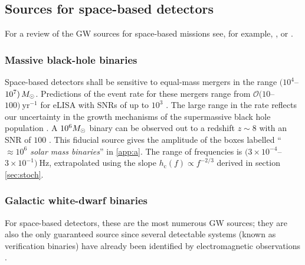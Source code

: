\subsection{Sources for space-based detectors}

For a review of the GW sources for space-based missions see, for example, \citet{Amaro-Seoane-et-al}, \citet{Gairetal} or \citet{eLISAyellowbook}.

\subsubsection{Massive black-hole binaries}

Space-based detectors shall be sensitive to equal-mass mergers in the range $(10^{4}$--$10^{7})\,M_{ \odot }$. Predictions of the event rate for these mergers range from ${\mathcal{O}}(10$--$100)~\mathrm{yr}^{-1}$ for eLISA with SNRs of up to $10^3$ \citep{TheGravitationalUniverse}. The large range in the rate reflects our uncertainty in the growth mechanisms of the supermassive black hole population \citep{Volonteri2010}. A $10^6 M_{ \odot }$ binary can be observed out to a redshift $z \sim 8$ with an SNR of $100$ \citep{TheGravitationalUniverse}. This fiducial source gives the amplitude of the boxes labelled ``\emph{$\mathit{\approx 10^{6}}$ solar mass binaries}'' in \ref{app:a}. The range of frequencies is $(3\times 10^{-4}$--$3\times 10^{-1})~\mathrm{Hz}$, extrapolated using the slope $h_\mathrm{c}(f) \propto f^{-2/3}$ derived in section \ref{sec:stoch}.


\subsubsection{Galactic white-dwarf binaries} \label{sec:GB}

For space-based detectors, these are the most numerous GW sources; they are also the only guaranteed source since several detectable systems (known as verification binaries) have already been identified by electromagnetic observations \citep{2006CQGra..23S.809S}.

